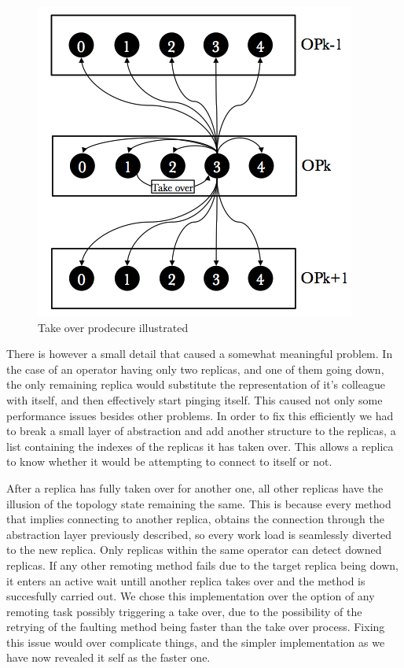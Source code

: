 \documentclass[times, 10pt,twocolumn]{article}
\begin{document}
\begin{figure}[h] \includegraphics[width=\columnwidth]{take_over}
	\caption{Take over prodecure illustrated} \end{figure}

There is however a small detail that caused a somewhat meaningful problem.
In the case of an operator having only two replicas, and one of them going
down, the only remaining replica would substitute the representation of
it's colleague with itself, and then effectively start pinging itself.
This caused not only some performance issues besides other problems.  In
order to fix this efficiently we had to break a small layer of abstraction
and add another structure to the replicas, a list containing the indexes
of the replicas it has taken over. This allows a replica to know whether
it would be attempting to connect to itself or not.

After a replica has fully taken over for another one, all other replicas
have the illusion of the topology state remaining the same. This is
because every method that implies connecting to another replica, obtains
the connection through the abstraction layer previously described, so
every work load is seamlessly diverted to the new replica.  Only replicas
within the same operator can detect downed replicas. If any other remoting
method fails due to the target replica being down, it enters an active
wait untill another replica takes over and the method is succesfully
carried out. We chose this implementation over the option of any remoting
task possibly triggering a take over, due to the possibility of the
retrying of the faulting method being faster than the take over process.
Fixing this issue would over complicate things, and the simpler
implementation as we have now revealed it self as the faster one.
\end{document}
